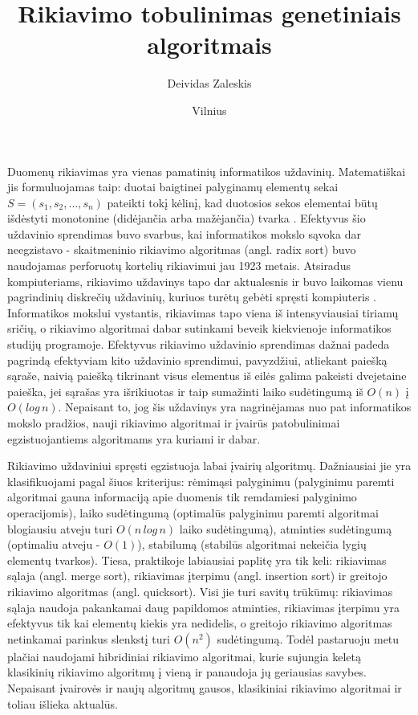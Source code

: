 \documentclass{VUMIFInfKursinis}
\institute{Informatikos institutas}  %
\title{Rikiavimo tobulinimas genetiniais algoritmais}
\author{Deividas Zaleskis}
\date{Vilnius \\ \the\year}
\begin{document}
\maketitle

\tableofcontents


Duomenų rikiavimas yra vienas pamatinių informatikos uždavinių.
Matematiškai jis formuluojamas taip:
duotai baigtinei palyginamų elementų sekai $S = (s_1, s_2, ..., s_n)$ pateikti tokį
kėlinį, kad duotosios sekos elementai būtų išdėstyti monotonine (didėjančia arba mažėjančia) tvarka \cite{Radavičius_Baranauskas_2013}.
Efektyvus šio uždavinio sprendimas buvo svarbus, kai informatikos mokslo sąvoka dar neegzistavo -
skaitmeninio rikiavimo algoritmas (angl. radix sort) buvo naudojamas perforuotų kortelių rikiavimui jau 1923 metais.
Atsiradus kompiuteriams, rikiavimo uždavinys tapo dar aktualesnis ir buvo laikomas vienu pagrindinių diskrečių uždavinių,
kuriuos turėtų gebėti spręsti kompiuteris \cite{10.1145/356580.356581}.
Informatikos mokslui vystantis, rikiavimas tapo viena iš intensyviausiai tiriamų sričių,
o rikiavimo algoritmai dabar sutinkami beveik kiekvienoje informatikos studijų programoje.
Efektyvus rikiavimo uždavinio sprendimas dažnai padeda pagrindą efektyviam kito uždavinio sprendimui,
pavyzdžiui, atliekant paiešką sąraše, naivią paiešką tikrinant visus elementus iš eilės galima pakeisti dvejetaine paieška, jei sąrašas yra išrikiuotas ir taip
sumažinti laiko sudėtingumą iš $O(n)$ į $O(log\,n)$.
Nepaisant to, jog šis uždavinys yra nagrinėjamas nuo pat informatikos mokslo pradžios,
nauji rikiavimo algoritmai ir įvairūs patobulinimai egzistuojantiems algoritmams yra kuriami ir dabar.

Rikiavimo uždaviniui spręsti egzistuoja labai įvairių algoritmų.
Dažniausiai jie yra klasifikuojami pagal šiuos kriterijus:
rėmimąsi palyginimu (palyginimu paremti algoritmai gauna informaciją apie duomenis tik remdamiesi palyginimo operacijomis),
laiko sudėtingumą (optimalūs palyginimu paremti algoritmai blogiausiu atveju turi $O(n\,log\,n)$ laiko sudėtingumą),
atminties sudėtingumą (optimaliu atveju - $O(1)$),
stabilumą (stabilūs algoritmai nekeičia lygių elementų tvarkos).
Tiesa, praktikoje labiausiai paplitę yra tik keli: rikiavimas sąlaja (angl. merge sort), rikiavimas įterpimu (angl. insertion sort) ir greitojo rikiavimo algoritmas (angl. quicksort).
Visi jie turi savitų trūkūmų: rikiavimas sąlaja naudoja pakankamai daug papildomos atminties, rikiavimas įterpimu yra efektyvus tik kai elementų kiekis yra nedidelis, o
greitojo rikiavimo algoritmas netinkamai parinkus slenkstį turi $O(n^2)$ sudėtingumą.
Todėl pastaruoju metu plačiai naudojami hibridiniai rikiavimo algoritmai, kurie sujungia keletą klasikinių rikiavimo
algoritmų į vieną ir panaudoja jų geriausias savybes.
Nepaisant įvairovės ir naujų algoritmų gausos, klasikiniai rikiavimo algoritmai ir toliau išlieka aktualūs.
\end{document}
